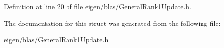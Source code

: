 Definition at line \hyperlink{eigen_2blas_2_general_rank1_update_8h_source_l00020}{20} of file \hyperlink{eigen_2blas_2_general_rank1_update_8h_source}{eigen/blas/\+General\+Rank1\+Update.\+h}.



The documentation for this struct was generated from the following file\+:\begin{DoxyCompactItemize}
\item 
eigen/blas/\+General\+Rank1\+Update.\+h\end{DoxyCompactItemize}
